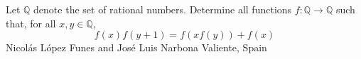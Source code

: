 Let $\mathbb{Q}$ denote the set of rational numbers. Determine all functions $f:\mathbb{Q}\longrightarrow\mathbb{Q}$ such that, for all $x, y \in \mathbb{Q}$,  $$f(x)f(y+1)=f(xf(y))+f(x)$$Nicolás López Funes and José Luis Narbona Valiente, Spain
